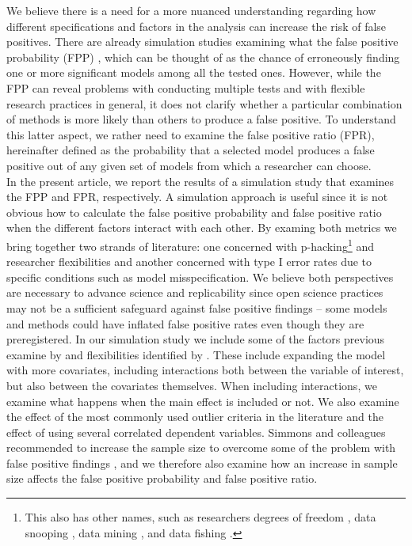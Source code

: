 We believe there is a need for a more nuanced understanding regarding how different specifications and factors in the analysis can increase the risk of false positives. There are already simulation studies examining what the false positive probability (FPP) \citep{Simmons2011}, which can be thought of as the chance of erroneously finding one or more significant models among all the tested ones. However, while the FPP can reveal problems with conducting multiple tests and with flexible research practices in general, it does not clarify whether a particular combination of methods is more likely than others to produce a false positive. To understand this latter aspect, we rather need to examine the false positive ratio (FPR), hereinafter defined as the probability that a selected model produces a false positive out of any given set of models from which a researcher can choose. \\

In the present article, we report the results of a simulation study that examines the FPP and FPR, respectively. A simulation approach is useful since it is not obvious how to calculate the false positive probability and false positive ratio when the different factors interact with each other. By examing both metrics we bring together two strands of literature: one concerned with p-hacking\footnote{This also has other names, such as researchers degrees of freedom \citep{Simmons2011}, data snooping \citep{white2000reality}, data mining \citep{lovell1983}, and data fishing \citep{selvin1966data} .} \citep{simonsohn2014p} and researcher flexibilities and another concerned with type I error rates due to specific conditions such as model misspecification. We believe both perspectives are necessary to advance science and replicability since open science practices may not be a sufficient safeguard against false positive findings – some models and methods could have inflated false positive rates even though they are preregistered. In our simulation study we include some of the factors previous examine by \cite{Simmons2011} and flexibilities identified by \cite{Wicherts2016}. These include expanding the model with more covariates, including interactions both between the variable of interest, but also between the covariates themselves. When including interactions, we examine what happens when the main effect is included or not. We also examine the effect of the most commonly used outlier criteria in the literature \citep{Leyes2013} and the effect of using several correlated dependent variables. Simmons and colleagues recommended to increase the sample size to overcome some of the problem with false positive findings \citep{Simmons2011}, and we therefore also examine how an increase in sample size affects the false positive probability and false positive ratio. 
